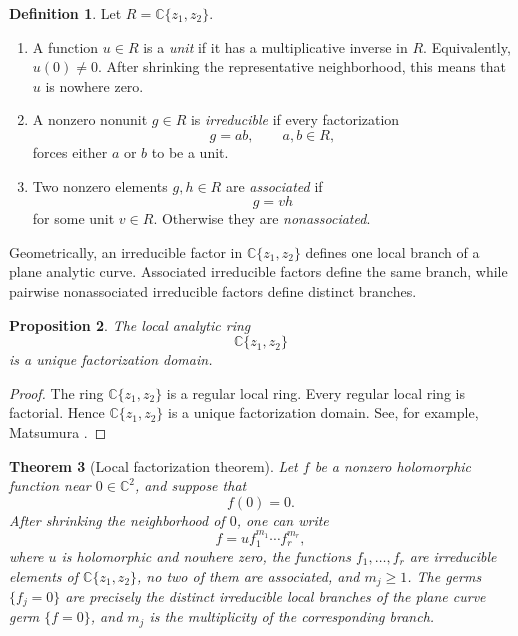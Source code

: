 \documentclass[11pt]{amsart}
\newtheorem{theorem}{Theorem}
\newtheorem{proposition}[theorem]{Proposition}
\theoremstyle{definition}
\newtheorem{definition}[theorem]{Definition}
\theoremstyle{remark}
\newcommand{\C}{\mathbb C}
\begin{document}
\begin{definition}\label{def:unit-irreducible-associated}
Let $R=\C\{z_1,z_2\}$.
\begin{enumerate}
\item A function $u\in R$ is a \emph{unit} if it has a multiplicative
inverse in $R$. Equivalently, $u(0)\ne0$. After shrinking the
representative neighborhood, this means that $u$ is nowhere zero.

\item A nonzero nonunit $g\in R$ is \emph{irreducible} if every
factorization
\[
        g=ab,
        \qquad a,b\in R,
\]
forces either $a$ or $b$ to be a unit.

\item Two nonzero elements $g,h\in R$ are \emph{associated} if
\[
        g=vh
\]
for some unit $v\in R$. Otherwise they are \emph{nonassociated}.
\end{enumerate}
\end{definition}

Geometrically, an irreducible factor in $\C\{z_1,z_2\}$ defines one
local branch of a plane analytic curve. Associated irreducible factors
define the same branch, while pairwise nonassociated irreducible factors
define distinct branches.

\begin{proposition}\label{prop:ufd-convergent-power-series}
The local analytic ring
\[
        \C\{z_1,z_2\}
\]
is a unique factorization domain.
\end{proposition}

\begin{proof}
The ring $\C\{z_1,z_2\}$ is a regular local ring. Every regular local
ring is factorial. Hence $\C\{z_1,z_2\}$ is a unique factorization
domain. See, for example, Matsumura \cite[Theorem~20.3]{Matsumura1986}.
\end{proof}

\begin{theorem}[Local factorization theorem]\label{th:local-factorization}
Let $f$ be a nonzero holomorphic function near $0\in\C^2$, and suppose
that
\[
        f(0)=0.
\]
After shrinking the neighborhood of $0$, one can write
\[
        f=u f_1^{m_1}\cdots f_r^{m_r},
\]
where $u$ is holomorphic and nowhere zero, the functions
$f_1,\ldots,f_r$ are irreducible elements of $\C\{z_1,z_2\}$, no two of
them are associated, and $m_j\ge1$. The germs $\{f_j=0\}$ are precisely
the distinct irreducible local branches of the plane curve germ
$\{f=0\}$, and $m_j$ is the multiplicity of the corresponding branch.
\end{theorem}
\end{document}

